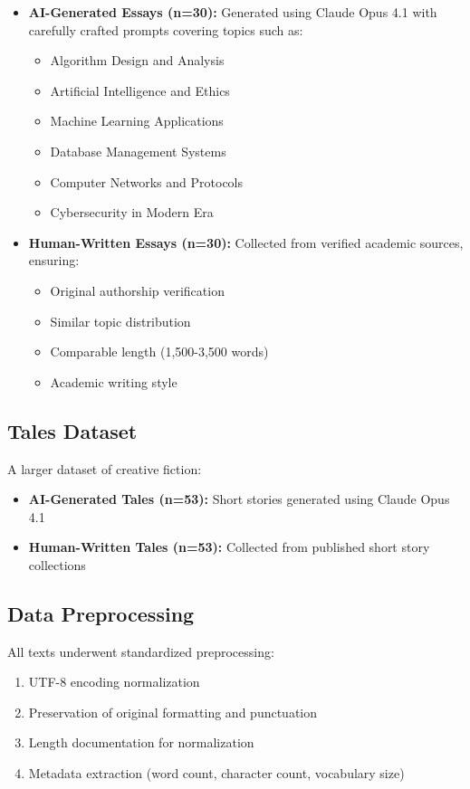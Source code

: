 \documentclass[12pt,a4paper]{report}
\begin{document}
\begin{itemize}
    \item \textbf{AI-Generated Essays (n=30):} Generated using Claude Opus 4.1 with carefully crafted prompts covering topics such as:
    \begin{itemize}
        \item Algorithm Design and Analysis
        \item Artificial Intelligence and Ethics
        \item Machine Learning Applications
        \item Database Management Systems
        \item Computer Networks and Protocols
        \item Cybersecurity in Modern Era
    \end{itemize}

    \item \textbf{Human-Written Essays (n=30):} Collected from verified academic sources, ensuring:
    \begin{itemize}
        \item Original authorship verification
        \item Similar topic distribution
        \item Comparable length (1,500-3,500 words)
        \item Academic writing style
    \end{itemize}
\end{itemize}

\subsection{Tales Dataset}

A larger dataset of creative fiction:

\begin{itemize}
    \item \textbf{AI-Generated Tales (n=53):} Short stories generated using Claude Opus 4.1
    \item \textbf{Human-Written Tales (n=53):} Collected from published short story collections
\end{itemize}

\subsection{Data Preprocessing}

All texts underwent standardized preprocessing:
\begin{enumerate}
    \item UTF-8 encoding normalization
    \item Preservation of original formatting and punctuation
    \item Length documentation for normalization
    \item Metadata extraction (word count, character count, vocabulary size)
\end{enumerate}
\end{document}
